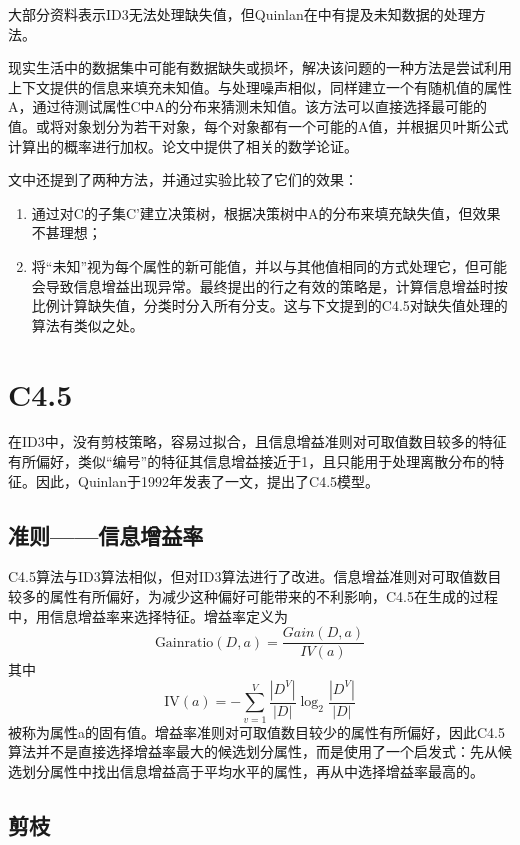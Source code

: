 \documentclass[fontset=windows]{article}
\begin{document}
大部分资料表示ID3无法处理缺失值，但Quinlan在\cite[Induction of Decision Trees]{ref1}中有提及未知数据的处理方法。

现实生活中的数据集中可能有数据缺失或损坏，解决该问题的一种方法是尝试利用上下文提供的信息来填充未知值。与处理噪声相似，同样建立一个有随机值的属性A，通过待测试属性C中A的分布来猜测未知值。该方法可以直接选择最可能的值。或将对象划分为若干对象，每个对象都有一个可能的A值，并根据贝叶斯公式计算出的概率进行加权。论文中提供了相关的数学论证。

文中还提到了两种方法，并通过实验比较了它们的效果：
\begin{enumerate}
      \item 通过对C的子集C'建立决策树，根据决策树中A的分布来填充缺失值，但效果不甚理想；
      \item 将“未知”视为每个属性的新可能值，并以与其他值相同的方式处理它，但可能会导致信息增益出现异常。最终提出的行之有效的策略是，计算信息增益时按比例计算缺失值，分类时分入所有分支。这与下文提到的C4.5对缺失值处理的算法有类似之处。
\end{enumerate}

\section{C4.5}

在ID3中，没有剪枝策略，容易过拟合，且信息增益准则对可取值数目较多的特征有所偏好，类似“编号”的特征其信息增益接近于1，且只能用于处理离散分布的特征。因此，Quinlan于1992年发表了\cite[C4. 5: programs for machine learning]{ref2}一文，提出了C4.5模型。

\subsection{准则——信息增益率}

C4.5算法与ID3算法相似，但对ID3算法进行了改进。信息增益准则对可取值数目较多的属性有所偏好，为减少这种偏好可能带来的不利影响，C4.5在生成的过程中，用信息增益率来选择特征。增益率定义为$$\text{Gainratio}\left(D,a\right)=\frac{Gain\left(D,a\right)}{IV\left(a\right)}$$其中$$\text{IV}\left(a\right)=-\sum_{v=1}^{V}{\frac{\left|D^V\right|}{\left|D\right|}\log_2{\frac{\left|D^V\right|}{\left|D\right|}}}$$被称为属性a的固有值。增益率准则对可取值数目较少的属性有所偏好，因此C4.5算法并不是直接选择增益率最大的候选划分属性，而是使用了一个启发式：先从候选划分属性中找出信息增益高于平均水平的属性，再从中选择增益率最高的。


\subsection{剪枝}
\end{document}
